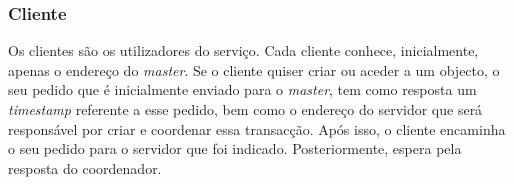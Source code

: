 \subsubsection{Cliente}

Os clientes são os utilizadores do serviço. Cada cliente conhece, inicialmente, apenas o endereço do \textit{master}. Se o cliente quiser criar ou aceder a um objecto, o seu pedido que é inicialmente enviado para o \textit{master}, tem como resposta um \textit{timestamp} referente a esse pedido, bem como o endereço do servidor que será responsável por criar e coordenar essa transacção. Após isso, o cliente encaminha o seu pedido para o servidor que foi indicado. Posteriormente, espera pela resposta do coordenador. 